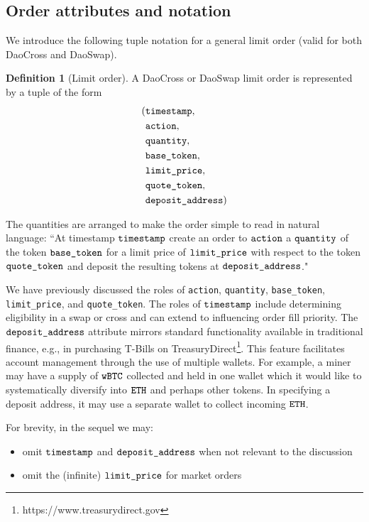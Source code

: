\documentclass[11pt, reqno]{amsart}
\theoremstyle{definition}
\newtheorem{defn}{Definition}[subsection]
\theoremstyle{remark}
\newcommand{\BTC}{\textnormal{\texttt{wBTC}}}
\newcommand{\ETH}{\textnormal{\texttt{ETH}}}
\newcommand{\timestamp}{\textnormal{\texttt{timestamp}}}
\newcommand{\action}{\textnormal{\texttt{action}}}
\newcommand{\quantity}{\textnormal{\texttt{quantity}}}
\newcommand{\basetoken}{\textnormal{\texttt{base\_token}}}
\newcommand{\limitprice}{\textnormal{\texttt{limit\_price}}}
\newcommand{\quotetoken}{\textnormal{\texttt{quote\_token}}}
\newcommand{\depositaddress}{\textnormal{\texttt{deposit\_address}}}
\begin{document}
\subsection{Order attributes and notation}
We introduce the following tuple notation for a general limit order
(valid for both DaoCross and DaoSwap).
\begin{defn}[Limit order]
A DaoCross or DaoSwap limit order is represented by a tuple of the form
\begin{align*}
( & \timestamp,       \\
  & \action,          \\
  & \quantity,        \\
  & \basetoken,       \\
  & \limitprice,      \\
  & \quotetoken,      \\
  & \depositaddress )
\end{align*}
\end{defn}

The quantities are arranged to make the order simple to read in natural
language:
``At timestamp $\timestamp$ create an order to $\action$ a $\quantity$ of
the token $\basetoken$ for a limit price of $\limitprice$ with respect to
the token $\quotetoken$ and deposit the resulting tokens at $\depositaddress$."

We have previously discussed the roles of \action, \quantity, \basetoken,
\limitprice, and \quotetoken.
The roles of $\timestamp$ include determining eligibility in a swap or
cross and can extend to influencing order fill priority.
The $\depositaddress$ attribute mirrors standard functionality
available in traditional finance, e.g., in purchasing T-Bills on
TreasuryDirect\footnote{https://www.treasurydirect.gov}. This feature
facilitates account management through the use of multiple wallets. For
example, a miner may have a supply of $\BTC$ collected and held in one wallet
which it would like to systematically diversify into $\ETH$ and perhaps other
tokens. In specifying a deposit address, it may use a separate wallet to collect
incoming $\ETH$.

For brevity, in the sequel we may:
\begin{itemize}
\item omit $\timestamp$ and $\depositaddress$ when not relevant to the
      discussion
\item omit the (infinite) $\limitprice$ for market orders
\end{itemize}
\end{document}
